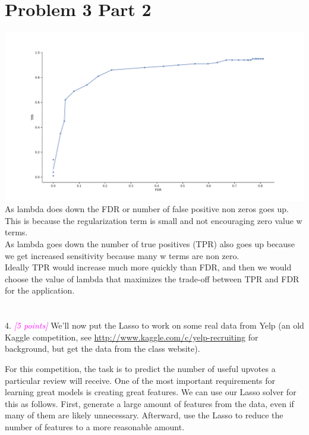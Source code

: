 \documentclass{article}
\newcommand{\1}{\mathbf{1}}
\newcommand{\grade}[1]{\small\textcolor{magenta}{\emph{[#1 points]}} \normalsize}
\begin{document}
\section*{Problem 3 Part 2}
\includegraphics[width=\textwidth]{hw2/P3part2.pdf}
As lambda does down the FDR or number of false positive non zeros goes up. This is because the regularization term is small and not encouraging zero value w terms.  \\

As lambda goes down the number of true positives (TPR) also goes up because we get increased sensitivity because many w terms are non zero. \\

Ideally TPR would increase much more quickly than FDR, and then we would choose the value of lambda that maximizes the trade-off between TPR and FDR for the application. 























\section*{}
4. \grade{5} We'll now put the Lasso to work on some real data from Yelp (an old Kaggle competition, see \url{http://www.kaggle.com/c/yelp-recruiting} for background, but get the data from the class website).

For this competition, the task is to predict the number of useful upvotes a particular review will receive. 
One of the most important requirements for learning great models is creating great features.  
We can use our Lasso solver for this as follows.  First, generate a large amount of features from the data, even if many of them are likely unnecessary.  Afterward, use the Lasso to reduce the number of features to a more reasonable amount. 
\end{document}
